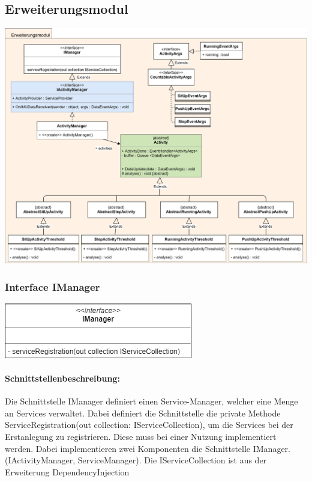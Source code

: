 \documentclass[a4paper,12pt]{article}
\begin{document}
\subsection{Erweiterungsmodul}
\begin{center}
	\centering
	\includegraphics[width=15cm]{bilder/ErweiterungsmodulTest.png}
\end{center}

\begin{minipage}[b]{0.5\textwidth}
	\subsubsection{Interface IManager}
	
	\end{minipage}
	\begin{minipage}[c]{0.5\textwidth}
	\includegraphics[width=\textwidth]{bilder/IManager.png}
\end{minipage}


	\paragraph{Schnittstellenbeschreibung:}
	Die Schnittstelle IManager definiert einen Service-Manager, welcher eine Menge an Services verwaltet. Dabei definiert die Schnittstelle die private Methode ServiceRegistration(out collection: IServiceCollection), um die Services bei der Erstanlegung zu registrieren. Diese muss bei einer Nutzung implementiert werden. Dabei implementieren zwei Komponenten die Schnittstelle IManager. (IActivityManager, ServiceManager). Die IServiceCollection ist aus der Erweiterung \Gls{DependencyInjection}
	
\end{document}
